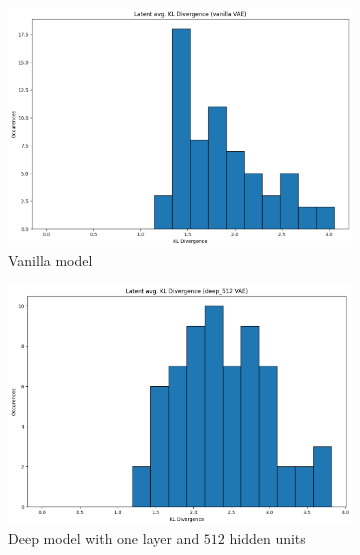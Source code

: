\documentclass[a4paper,11pt]{article}
\begin{document}
\begin{figure}[ht]
    \centering
    \begin{subfigure}[t]{0.3\textwidth}
        \includegraphics[width=\textwidth]{../images/collapse_vanilla.png}
        \caption{Vanilla model}
    \end{subfigure}
    \hfill
    \begin{subfigure}[t]{0.3\textwidth}
        \includegraphics[width=\textwidth]{../images/collapse_512.png}
        \caption{Deep model with one layer and $512$ hidden units}
    \end{subfigure}
    \hfill
    \begin{subfigure}[t]{0.3\textwidth}

\end{subfigure}
\end{figure}
\end{document}
